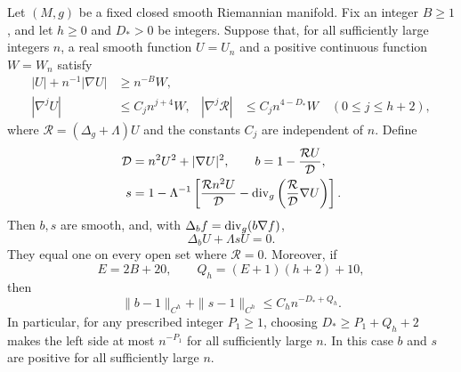 \begin{lemma}
\label{lem:exact-quotients}
Let \((M,g)\) be a fixed closed smooth Riemannian manifold.  Fix an integer
\(B\ge1\), and let \(h\ge0\) and \(D_*>0\) be integers.  Suppose that, for
all sufficiently large integers \(n\), a real smooth function \(U=U_n\)
and a positive continuous function \(W=W_n\) satisfy
\begin{align}
 |U|+n^{-1}|\nabla U|&\ge n^{-B}W,
 \label{eq:exact-jet-hypothesis}\\
 |\nabla^jU|&\le C_j n^{j+4}W,
 &|\nabla^j\mathcal R|&\le C_jn^{4-D_*}W
 \quad (0\le j\le h+2),
 \label{eq:exact-weighted-hypothesis}
\end{align}
where \(\mathcal R=(\Delta_g+\Lambda)U\) and the constants \(C_j\) are
independent of \(n\).  Define
\begin{equation}
 \begin{aligned}
 \mathcal D&=n^2U^2+|\nabla U|^2,\qquad
 b=1-\frac{\mathcal R U}{\mathcal D},\\
 s&=1-\Lambda^{-1}\left[
 \frac{\mathcal R n^2U}{\mathcal D}
 -\operatorname{div}_g\left(\frac{\mathcal R}{\mathcal D}\nabla U\right)\right].
 \end{aligned}
 \label{eq:exact-scalar-correction}
\end{equation}
Then \(b,s\) are smooth, and, with
\(\Delta_b f=\operatorname{div}_g(b\nabla f)\),
\begin{equation}
 \Delta_bU+\Lambda sU=0.
 \label{eq:exact-weighted-equation}
\end{equation}
They equal one on every open set where \(\mathcal R=0\).  Moreover, if
\[
 E=2B+20,\qquad Q_h=(E+1)(h+2)+10,
\]
then
\begin{equation}
 \|b-1\|_{C^h}+\|s-1\|_{C^h}
 \le C_h n^{-D_*+Q_h}.
 \label{eq:exact-quotient-bound}
\end{equation}
In particular, for any prescribed integer \(P_1\ge1\), choosing
\(D_*\ge P_1+Q_h+2\) makes the left side at most \(n^{-P_1}\) for all
sufficiently large \(n\).  In this case \(b\) and \(s\) are positive for
all sufficiently large \(n\).
\end{lemma}

